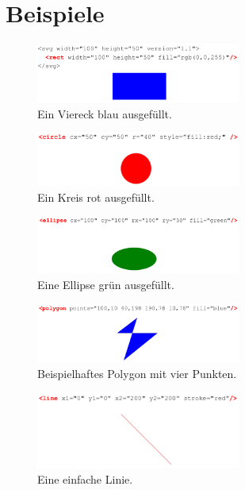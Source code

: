 \appendix

\section{Beispiele}

\begin{figure}[h!]\centering
\includegraphics[width=0.6\textwidth]{pictures/rect.png}
\caption{Ein Viereck blau ausgefüllt.}
\label{fig:rect}\end{figure}
\begin{figure}[h!]\centering
\includegraphics[width=0.6\textwidth]{pictures/circle.png}
\caption{Ein Kreis rot ausgefüllt.}
\label{fig:circle}\end{figure}
\begin{figure}[h!]\centering
\includegraphics[width=0.6\textwidth]{pictures/ellipse.png}
\caption{Eine Ellipse grün ausgefüllt.}
\label{fig:ellipse}\end{figure}
\begin{figure}[h!]\centering
\includegraphics[width=0.6\textwidth]{pictures/polygon.png}
\caption{Beispielhaftes Polygon mit vier Punkten.}
\label{fig:poly}\end{figure}
\begin{figure}[h!]\centering
\includegraphics[width=0.6\textwidth]{pictures/line.png}
\caption{Eine einfache Linie.}
\label{fig:line}\end{figure}
